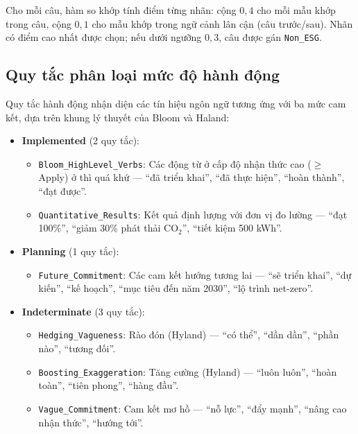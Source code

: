 Cho mỗi câu, hàm so khớp tính điểm từng nhãn: cộng $0{,}4$ cho mỗi mẫu khớp trong câu, cộng $0{,}1$ cho mẫu khớp trong ngữ cảnh lân cận (câu trước/sau). Nhãn có điểm cao nhất được chọn; nếu dưới ngưỡng $0{,}3$, câu được gán \texttt{Non\_ESG}.


\subsection{Quy tắc phân loại mức độ hành động}
\label{subsec:action_rules}

Quy tắc hành động nhận diện các tín hiệu ngôn ngữ tương ứng với ba mức cam kết, dựa trên khung lý thuyết của Bloom và Haland:

\begin{itemize}
    \item \textbf{Implemented} (2 quy tắc):
    \begin{itemize}
        \item \texttt{Bloom\_HighLevel\_Verbs}: Các động từ ở cấp độ nhận thức cao ($\geq$ Apply) ở thì quá khứ --- ``đã triển khai'', ``đã thực hiện'', ``hoàn thành'', ``đạt được''.
        \item \texttt{Quantitative\_Results}: Kết quả định lượng với đơn vị đo lường --- ``đạt 100\%'', ``giảm 30\% phát thải CO$_2$'', ``tiết kiệm 500 kWh''.
    \end{itemize}

    \item \textbf{Planning} (1 quy tắc):
    \begin{itemize}
        \item \texttt{Future\_Commitment}: Các cam kết hướng tương lai --- ``sẽ triển khai'', ``dự kiến'', ``kế hoạch'', ``mục tiêu đến năm 2030'', ``lộ trình net-zero''.
    \end{itemize}

    \item \textbf{Indeterminate} (3 quy tắc):
    \begin{itemize}
        \item \texttt{Hedging\_Vagueness}: Rào đón (Hyland) --- ``có thể'', ``dần dần'', ``phần nào'', ``tương đối''.
        \item \texttt{Boosting\_Exaggeration}: Tăng cường (Hyland) --- ``luôn luôn'', ``hoàn toàn'', ``tiên phong'', ``hàng đầu''.
        \item \texttt{Vague\_Commitment}: Cam kết mơ hồ --- ``nỗ lực'', ``đẩy mạnh'', ``nâng cao nhận thức'', ``hướng tới''.
    \end{itemize}
\end{itemize}


